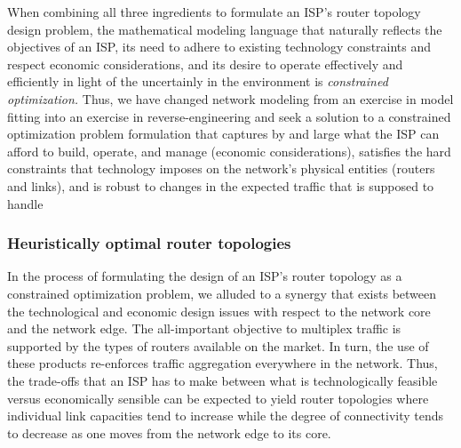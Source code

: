 When combining all three ingredients to formulate an ISP's router topology design 
problem, the mathematical modeling language that naturally reflects the objectives
of an ISP, its need to adhere to existing technology constraints and respect
economic considerations, and its desire to operate effectively and efficiently in
light of the uncertainly in the environment is {\it constrained optimization.}  
Thus, we have changed network modeling from an exercise in model fitting into an
exercise in reverse-engineering and seek a solution to a constrained optimization
problem formulation that captures by and large what the ISP can afford to build, 
operate, and manage (\ie economic considerations), satisfies the hard constraints 
that technology imposes on the network's physical entities (\ie routers and links),
and is robust to changes in the expected traffic that is supposed to handle


\subsubsection{Heuristically optimal router topologies}

In the process of formulating the design of an ISP's router topology as a constrained
optimization problem, we alluded to a synergy that exists between the technological
and economic design issues with respect to the network core and the network edge.
The all-important objective to multiplex traffic is supported by the types of 
routers available on the market. In turn, the use of these products re-enforces traffic 
aggregation everywhere in the network. Thus, the trade-offs that an ISP has to make
between what is technologically feasible versus economically sensible can be expected 
to yield router topologies where individual link capacities tend to increase while
the degree of connectivity tends to decrease as one moves from the network edge to 
its core.  


